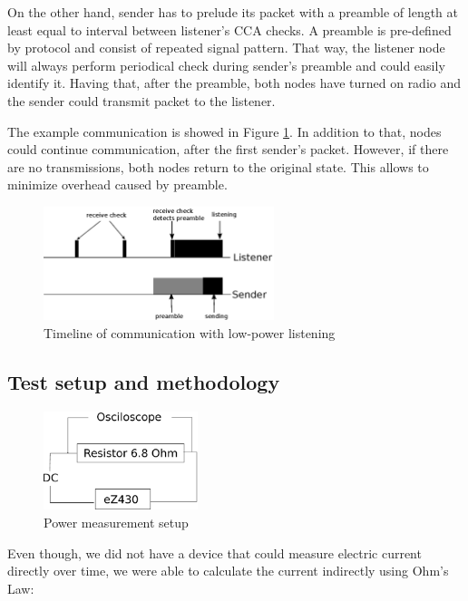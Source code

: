 On the other hand, sender has to prelude its packet with a preamble of length at least equal to interval between listener's CCA checks.
A preamble is pre-defined by protocol and consist of repeated signal pattern.
That way, the listener node will always perform periodical check during sender's preamble and could easily identify it.
Having that, after the preamble, both nodes have turned on radio and the sender could transmit packet to the listener.

The example communication is showed in Figure \ref{fig:low_power_listening}.
In addition to that, nodes could continue communication, after the first sender's packet.
However, if there are no transmissions, both nodes return to the original state.
This allows to minimize overhead caused by preamble.

\begin{figure}[h]
  \centering
  \includegraphics[width=0.6\textwidth]{diagrams/low_power_listening.eps}
  \caption{Timeline of communication with low-power listening}
  \label{fig:low_power_listening}
\end{figure}

\subsection{Test setup and methodology}

\begin{figure}[h]
  \centering
  \includegraphics[width=0.4\textwidth]{diagrams/power.eps}
  \caption{Power measurement setup}
  \label{fig:power}
\end{figure}

Even though, we did not have a device that could measure electric current directly over time, we were able to calculate the current indirectly using Ohm's Law: 

